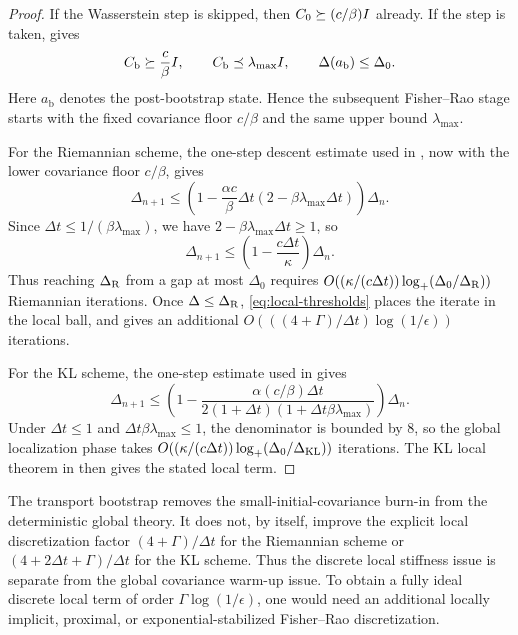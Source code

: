 \begin{proof}
If the Wasserstein step is skipped, then $C_0\succeq(c/\beta)I$ already. If the step is taken,
 gives
\[
    C_{\mathrm b}\succeq\frac c\beta I,
    \qquad
    C_{\mathrm b}\preceq\lambda_{\max}I,
    \qquad
    \Delta(a_{\mathrm b})\le\Delta_0.
\]
Here $a_{\mathrm b}$ denotes the post-bootstrap state. Hence the subsequent Fisher--Rao stage
starts with the fixed covariance floor $c/\beta$ and the same upper bound $\lambda_{\max}$.

For the Riemannian scheme, the one-step descent estimate used in , now
with the lower covariance floor $c/\beta$, gives
\[
    \Delta_{n+1}
    \le
    \left(1-\frac{\alpha c}{\beta}\Delta t(2-\beta\lambda_{\max}\Delta t)\right)\Delta_n.
\]
Since $\Delta t\le1/(\beta\lambda_{\max})$, we have $2-\beta\lambda_{\max}\Delta t\ge1$, so
\[
    \Delta_{n+1}
    \le
    \left(1-\frac{c\Delta t}{\kappa}\right)\Delta_n.
\]
Thus reaching $\Delta_{\mathrm{R}}$ from a gap at most $\Delta_0$ requires
$O((\kappa/(c\Delta t))\log_+(\Delta_0/\Delta_{\mathrm{R}}))$ Riemannian iterations. Once
$\Delta\le\Delta_{\mathrm{R}}$, \eqref{eq:local-thresholds} places the iterate in the local ball, and
 gives an additional
$O(((4+\Gamma)/\Delta t)\log(1/\epsilon))$ iterations.

For the KL scheme, the one-step estimate used in  gives
\[
    \Delta_{n+1}
    \le
    \left(
        1-
        \frac{\alpha (c/\beta)\Delta t}
        {2(1+\Delta t)(1+\Delta t\beta\lambda_{\max})}
    \right)\Delta_n.
\]
Under $\Delta t\le1$ and $\Delta t\beta\lambda_{\max}\le1$, the denominator is bounded by $8$,
so the global localization phase takes
$O((\kappa/(c\Delta t))\log_+(\Delta_0/\Delta_{\mathrm{KL}}))$ iterations. The KL local theorem in
 then gives the stated local term.
\end{proof}

\begin{remark}
\label{rem:transport-bootstrap-caveat}
The transport bootstrap removes the small-initial-covariance burn-in from the deterministic
global theory. It does not, by itself, improve the explicit local discretization factor
$(4+\Gamma)/\Delta t$ for the Riemannian scheme or $(4+2\Delta t+\Gamma)/\Delta t$ for the KL
scheme. Thus the discrete local stiffness issue is separate from the global covariance warm-up
issue. To obtain a fully ideal discrete local term of order $\Gamma\log(1/\epsilon)$, one would
need an additional locally implicit, proximal, or exponential-stabilized Fisher--Rao discretization.
\end{remark}

